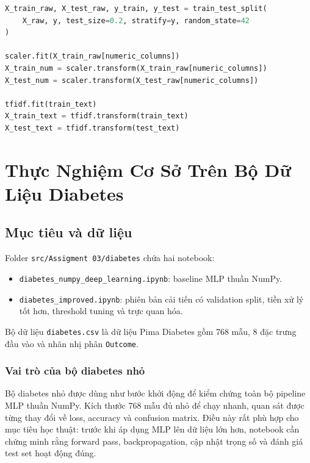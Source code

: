 \documentclass[12pt,a4paper]{report}
\newcommand{\modelpath}[1]{\texttt{#1}}
\begin{document}
\begin{lstlisting}[language=Python, caption={Nguyên tắc fit trên train, transform trên validation/test}, label={lst:leakage}]
X_train_raw, X_test_raw, y_train, y_test = train_test_split(
    X_raw, y, test_size=0.2, stratify=y, random_state=42
)

scaler.fit(X_train_raw[numeric_columns])
X_train_num = scaler.transform(X_train_raw[numeric_columns])
X_test_num = scaler.transform(X_test_raw[numeric_columns])

tfidf.fit(train_text)
X_train_text = tfidf.transform(train_text)
X_test_text = tfidf.transform(test_text)
\end{lstlisting}

\chapter{Thực Nghiệm Cơ Sở Trên Bộ Dữ Liệu Diabetes}

\section{Mục tiêu và dữ liệu}
Folder \modelpath{src/Assigment 03/diabetes} chứa hai notebook:
\begin{itemize}
    \item \modelpath{diabetes\_numpy\_deep\_learning.ipynb}: baseline MLP thuần NumPy.
    \item \modelpath{diabetes\_improved.ipynb}: phiên bản cải tiến có validation split, tiền xử lý tốt hơn, threshold tuning và trực quan hóa.
\end{itemize}
Bộ dữ liệu \modelpath{diabetes.csv} là dữ liệu Pima Diabetes gồm 768 mẫu, 8 đặc trưng đầu vào và nhãn nhị phân \texttt{Outcome}.

\subsection{Vai trò của bộ diabetes nhỏ}
Bộ diabetes nhỏ được dùng như bước khởi động để kiểm chứng toàn bộ pipeline MLP thuần NumPy.
Kích thước 768 mẫu đủ nhỏ để chạy nhanh, quan sát được từng thay đổi về loss, accuracy và confusion matrix.
Điều này rất phù hợp cho mục tiêu học thuật: trước khi áp dụng MLP lên dữ liệu lớn hơn, notebook cần chứng minh rằng forward pass, backpropagation, cập nhật trọng số và đánh giá test set hoạt động đúng.
\end{document}
